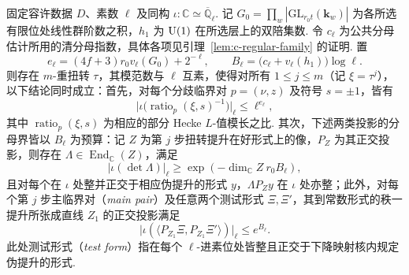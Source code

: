 \begin{lemma}[单个有限位上的扭转分母控制]
\label{lem:c-local-twist}
\emitthmsource
固定容许数据 $D$、素数 $\ell$ 及同构 $\iota:\mathbb C\simeq\overline{\mathbb Q}_\ell$.
记 $G_0=\prod_w|\mathrm{GL}_{r_0t}(\mathbf k_w)|$ 为各所选有限位处线性群阶数之积，$h_1$ 为 $\operatorname{U}(1)$ 在所选层上的双陪集数. 令 $c_\ell$ 为公共分母估计所用的清分母指数，具体各项见引理~\ref{lem:c-regular-family} 的证明. 置
\[
 e_\ell=(4f+3)r_0v_\ell(G_0)+2^{-\ell},\qquad
 B_\ell=\bigl(c_\ell+v_\ell(h_1)\bigr)\log\ell .
\]
则存在 $m$-重扭转 $\tau$，其模范数与 $\ell$ 互素，使得对所有 $1\le j\le m$（记 $\xi=\tau^j$），以下结论同时成立：首先，对每个分歧临界对 $p=(\nu,z)$ 及符号 $s=\pm1$，皆有
\[
 \bigl|\iota\bigl(\operatorname{ratio}_p(\xi,s)^{-1}\bigr)\bigr|_\ell
 \le \ell^{e_\ell},
\]
其中 $\operatorname{ratio}_p(\xi,s)$ 为相应的部分 Hecke $L$-值模长之比.
其次，下述两类投影的分母界皆以 $B_\ell$ 为预算：记 $Z$ 为第 $j$ 步扭转提升在好形式上的像，$P_Z$ 为其正交投影，则存在 $\Lambda\in\operatorname{End}_{\mathbb C}(Z)$，满足
\[
 |\iota(\det\Lambda)|_\ell\ge \exp(-\dim_{\mathbb C}Z\ r_0 B_\ell),
\]
且对每个在 $\iota$ 处整并正交于相应伪提升的形式 $y$，$\Lambda P_Z y$ 在 $\iota$ 处亦整；此外，对每个第 $j$ 步主临界对（\emph{main pair}）及任意两个测试形式 $\Xi,\Xi'$，其到常数形式的秩一提升所张成直线 $Z_1$ 的正交投影满足
\[
 \bigl|\iota(\langle P_{Z_1}\Xi,P_{Z_1}\Xi'\rangle)\bigr|_\ell\le e^{B_\ell}.
\]
此处测试形式（\emph{test form}）指在每个 $\ell$-进素位处皆整且正交于下降映射核内规定伪提升的形式.
\end{lemma}

